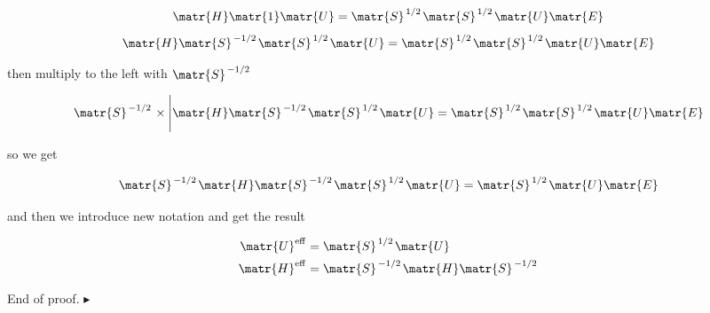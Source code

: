 \begin{equation}
 \matr{H}\matr{1}\matr{U} = 
 \matr{S}^{\left. {1} \middle/ {2} \right.}
 \matr{S}^{\left. {1} \middle/ {2} \right.} 
 \matr{U}\matr{E} 
   \label{ eq:eq12 }
\end{equation}
\begin{equation}
 \matr{H}\matr{S}^{\left. {-1} \middle/ {2} \right.}
 \matr{S}^{\left. {1} \middle/ {2} \right.}  
 \matr{U} = \matr{S}^{\left. {1} \middle/ {2} \right.}
 \matr{S}^{\left. {1} \middle/ {2} \right.} 
 \matr{U}\matr{E}
   \label{ eq:eq13 }
\end{equation}

then multiply to the left with 
$\matr{S}^{\left. {-1} \middle/ {2} \right.}$

\begin{equation}
 \matr{S}^{\left. {-1} \middle/ {2} \right.} \times \Bigg|
 \matr{H}
 \matr{S}^{\left. {-1} \middle/ {2} \right.}
 \matr{S}^{\left. {1} \middle/ {2} \right.}  
 \matr{U} = 
 \matr{S}^{\left. {1} \middle/ {2} \right.}
 \matr{S}^{\left. {1} \middle/ {2} \right.} 
 \matr{U}\matr{E}
   \label{ eq:eq15 }
\end{equation}

so we get

\begin{equation}
 \matr{S}^{\left. {-1} \middle/ {2} \right.}
 \matr{H}
 \matr{S}^{\left. {-1} \middle/ {2} \right.}
 \matr{S}^{\left. {1} \middle/ {2} \right.}  
 \matr{U} = 
 \matr{S}^{\left. {1} \middle/ {2} \right.} 
 \matr{U}\matr{E}  
\end{equation}

and then we introduce new notation and get the result

\begin{equation}
 \begin{aligned}
 \matr{U}^{\mathrm{eff}} &= 
 \matr{S}^{\left. {1} \middle/ {2} \right.} 
 \matr{U} \\
 \matr{H}^{\mathrm{eff}} &=
 \matr{S}^{\left. {-1} \middle/ {2} \right.}
 \matr{H}
 \matr{S}^{\left. {-1} \middle/ {2} \right.}
 \end{aligned}
\end{equation}

End of proof. $\blacktriangleright$

